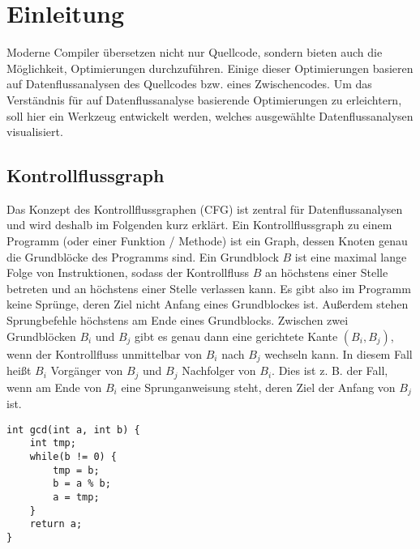 
\section{Einleitung}

Moderne Compiler übersetzen nicht nur Quellcode, sondern bieten auch die Möglichkeit, Optimierungen durchzuführen. 
Einige dieser Optimierungen basieren auf Datenflussanalysen des Quellcodes bzw. eines Zwischencodes.
Um das Verständnis für auf Datenflussanalyse basierende Optimierungen zu erleichtern, soll hier ein Werkzeug entwickelt werden, welches ausgewählte Datenflussanalysen visualisiert.

\subsection{Kontrollflussgraph}
Das Konzept des Kontrollflussgraphen (CFG) ist zentral für Datenflussanalysen und wird deshalb im Folgenden kurz erklärt.
Ein Kontrollflussgraph zu einem Programm (oder einer Funktion / Methode) ist ein Graph, dessen Knoten genau die Grundblöcke des Programms sind.
Ein Grundblock $B$ ist eine maximal lange Folge von Instruktionen, sodass der Kontrollfluss $B$ an höchstens einer Stelle betreten und an höchstens einer Stelle verlassen kann.
Es gibt also im Programm keine Sprünge, deren Ziel nicht Anfang eines Grundblockes ist.
Außerdem stehen Sprungbefehle höchstens am Ende eines Grundblocks.
Zwischen zwei Grundblöcken $B_i$ und $B_j$ gibt es genau dann eine gerichtete Kante $(B_i,B_j)$, wenn der Kontrollfluss unmittelbar von $B_i$ nach $B_j$ wechseln kann.
In diesem Fall heißt $B_i$ Vorgänger von $B_j$ und $B_j$ Nachfolger von $B_i$.
Dies ist z. B. der Fall, wenn am Ende von $B_i$ eine Sprunganweisung steht, deren Ziel der Anfang von $B_j$ ist.

\par

\begin{lstlisting}[frame=single, captionpos=b, caption=Simple Funktion zur Veranschaulichung eines CFG]
int gcd(int a, int b) {
	int tmp;
	while(b != 0) {
		tmp = b;
		b = a % b;
		a = tmp;
	}
	return a;
}
\end{lstlisting}

\par

